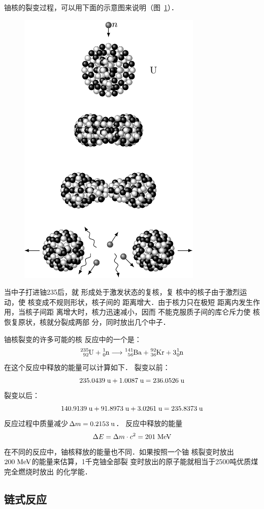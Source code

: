 铀核的裂变过程，可以用下面的示意图来说明（图~\ref{fig_C_9-12}）．
\begin{figure}[htbp]
    \centering
    \includegraphics{fig/C/9-12.pdf}
    \caption{}\label{fig_C_9-12}
\end{figure}

当中子打进铀235后，就
形成处于激发状态的复核，复
核中的核子由于激烈运动，使
核变成不规则形状，核子间的
距离增大．由于核力只在极短
距离内发生作用，当核子间距
离增大时，核力迅速减小，因而
不能克服质子间的库仑斥力使
核恢复原状，核就分裂成两部
分，同时放出几个中子．

铀核裂变的许多可能的核
反应中的一个是：
\[\atom{U}{235}{92}+\atom{n}{1}{0}\longrightarrow \atom{Ba}{141}{56}+\atom{Kr}{92}{36}+3\atom{n}{1}{0}\]
在这个反应中释放的能量可以计算如下．
裂变以前：
\[235.0439\;\text{u} +1.0087\;\text{u} =236.0526\;\text{u} \]
裂变以后：
\[140.9139\;\text{u} +91.8973\;\text{u} +3.0261\;\text{u} =235.8373\;\text{u} \]
反应过程中质量减少$\Delta m=0.2153\;\text{u}$．
反应中释放的能量
\[\Delta E=\Delta m\cdot c^2=201 \;\text{MeV} \]
在不同的反应中，铀核释放的能量也不同．如果按照一个铀
核裂变时放出$200\;\text{MeV}$的能量来估算，1千克铀全部裂
变时放出的原子能就相当于2500吨优质煤完全燃烧时放出
的化学能．

\subsection{链式反应} 

